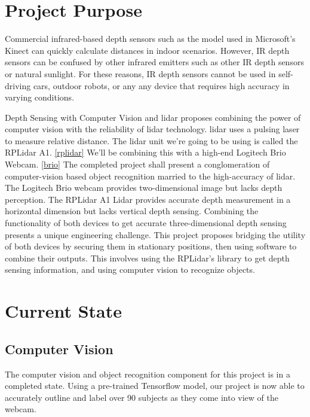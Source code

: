 \documentclass[onecolumn, draftclsnofoot,10pt, compsoc]{IEEEtran}
\begin{document}
\begin{singlespace}
		
	\section{Project Purpose}
		Commercial infrared-based depth sensors such as the model used in Microsoft's Kinect can quickly calculate distances in indoor scenarios.
		However, IR depth sensors can be confused by other infrared emitters such as other IR depth sensors or natural sunlight.
		For these reasons, IR depth sensors cannot be used in self-driving cars, outdoor robots, or any any device that requires high accuracy in varying conditions.


		Depth Sensing with Computer Vision and lidar proposes combining the power of computer vision with the reliability of lidar technology.
		lidar uses a pulsing laser to measure relative distance.
		The lidar unit we're going to be using is called the RPLidar A1. \ref{rplidar}
		We'll be combining this with a high-end Logitech Brio Webcam. \ref{brio}
		The completed project shall present a conglomeration of computer-vision based object recognition married to the high-accuracy of lidar.
		The Logitech Brio webcam provides two-dimensional image but lacks depth perception.
		The RPLidar A1 Lidar provides accurate depth measurement in a horizontal dimension but lacks vertical depth sensing.
		Combining the functionality of both devices to get accurate three-dimensional depth sensing presents a unique engineering challenge.
		This project proposes bridging the utility of both devices by securing them in stationary positions, then using software to combine their outputs.
		This involves using the RPLidar's library to get depth sensing information, and using computer vision to recognize objects.

	\section{Current State}

		\subsection{Computer Vision}
			The computer vision and object recognition component for this project is in a completed state.
			Using a pre-trained Tensorflow model, our project is now able to accurately outline and label over 90 subjects as they come into view of the webcam.
			

\end{singlespace}
\end{document}
